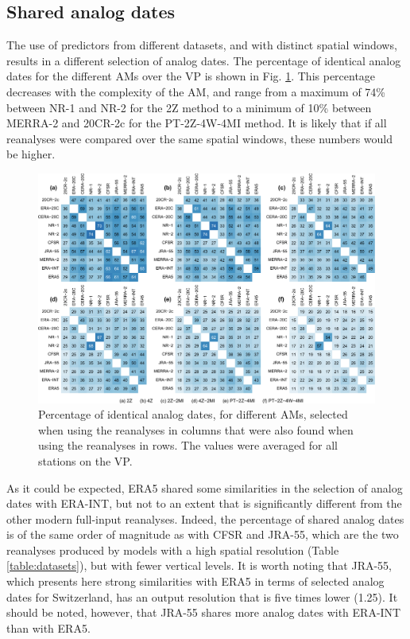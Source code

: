 \documentclass[alpha-refs]{wiley-article}
\begin{document}
\subsection{Shared analog dates}
\label{sec:results_shared_dates}

The use of predictors from different datasets, and with distinct spatial windows, results in a different selection of analog dates. The percentage of identical analog dates for the different AMs over the VP is shown in Fig. \ref{fig:shared-dates}. This percentage decreases with the complexity of the AM, and range from a maximum of 74\% between NR-1 and NR-2 for the 2Z method to a minimum of 10\% between MERRA-2 and 20CR-2c for the PT-2Z-4W-4MI method. It is likely that if all reanalyses were compared over the same spatial windows, these numbers would be higher.

\begin{figure}[bt]
	\centering
	\includegraphics[width=120mm]{figures/similar-dates.pdf}
	\caption{Percentage of identical analog dates, for different AMs, selected when using the reanalyses in columns that were also found when using the reanalyses in rows. The values were averaged for all stations on the VP.}
	\label{fig:shared-dates}
\end{figure}

As it could be expected, ERA5 shared some similarities in the selection of analog dates with ERA-INT, but not to an extent that is significantly different from the other modern full-input reanalyses. Indeed, the percentage of shared analog dates is of the same order of magnitude as with CFSR and JRA-55, which are the two reanalyses produced by models with a high spatial resolution (Table \ref{table:datasets}), but with fewer vertical levels. It is worth noting that JRA-55, which presents here strong similarities with ERA5 in terms of selected analog dates for Switzerland, has an output resolution that is five times lower (1.25\degree). It should be noted, however, that JRA-55 shares more analog dates with ERA-INT than with ERA5. 
\end{document}

